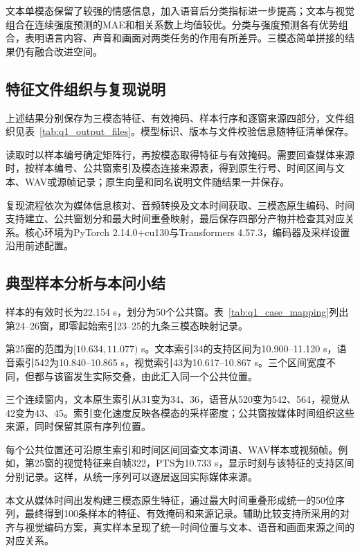 

文本单模态保留了较强的情感信息，加入语音后分类指标进一步提高；文本与视觉组合在连续强度预测的MAE和相关系数上均值较优。分类与强度预测各有优势组合，表明语言内容、声音和画面对两类任务的作用有所差异。三模态简单拼接的结果仍有融合改进空间。
\FloatBarrier

\subsection{特征文件组织与复现说明}\label{subsec:q1_repro}
上述结果分别保存为三模态特征、有效掩码、样本行序和逐窗来源四部分，文件组织见表~\ref{tab:q1_output_files}。模型标识、版本与文件校验信息随特征清单保存。



读取时以样本编号确定矩阵行，再按模态取得特征与有效掩码。需要回查媒体来源时，按样本编号、公共窗索引及模态连接来源表，得到原生行号、时间区间与文本、WAV或源帧记录；原生向量和同名说明文件随结果一并保存。

复现流程依次为媒体信息核对、音频转换及文本时间获取、三模态原生编码、时间支持建立、公共窗划分和最大时间重叠映射，最后保存四部分产物并检查其对应关系。核心环境为PyTorch 2.14.0+cu130与Transformers 4.57.3，编码器及采样设置沿用前述配置。
\FloatBarrier

\subsection{典型样本分析与本问小结}\label{subsec:q1_case_summary}
样本\texttt{}的有效时长为22.154 s，划分为50个公共窗。表~\ref{tab:q1_case_mapping}列出第24--26窗，即零起始索引23--25的九条三模态映射记录。



第25窗的范围为$[10.634,11.077)$ s。文本索引34的支持区间为10.900--11.120 s，语音索引542为10.840--10.865 s，视觉索引43为10.617--10.867 s。三个区间宽度不同，但都与该窗发生实际交叠，由此汇入同一个公共位置。

三个连续窗内，文本原生索引从31变为34、36，语音从520变为542、564，视觉从42变为43、45。索引变化速度反映各模态的采样密度；公共窗按媒体时间组织这些来源，同时保留其原有序列位置。

每个公共位置还可沿原生索引和时间区间回查文本词语、WAV样本或视频帧。例如，第25窗的视觉特征来自帧322，PTS为10.733 s，显示时刻与该特征的支持区间分别记录。这样，从统一序列可以逐层返回实际媒体来源。

本文从媒体时间出发构建三模态原生特征，通过最大时间重叠形成统一的50位序列，最终得到100条样本的特征、有效掩码和来源记录。辅助比较支持所采用的对齐与视觉编码方案，真实样本呈现了统一时间位置与文本、语音和画面来源之间的对应关系。
\FloatBarrier
